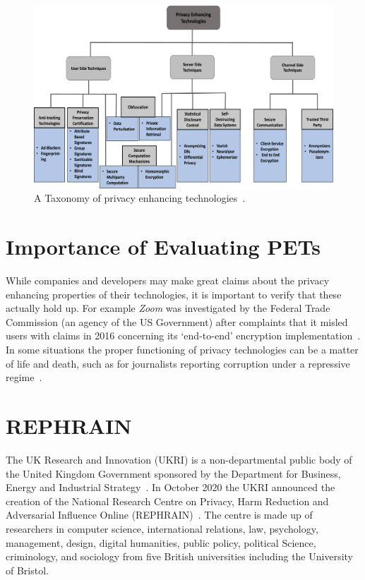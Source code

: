 \documentclass[
    author={Jacob Daniel Halsey},
    supervisor={Prof. Awais Rashid},
    degree={BSc},
    title={Building a Testbed for Evaluating Privacy Enhancing Technologies  (PETs)},
    subtitle={},
    type={software development},
    year={2021}
]{dissertation}
\begin{document}
\begin{figure}
	\centering
	\includegraphics{img/pet_taxonomy}
	\caption{A Taxonomy of privacy enhancing technologies~\cite{kaaniche_2020_privacy}.}
	\label{pet_taxonomy}
\end{figure}

\section{Importance of Evaluating PETs}

While companies and developers may make great claims about the privacy enhancing properties
of their technologies, it is important to verify that these actually hold up.
For example \emph{Zoom} was investigated by the Federal Trade Commission (an agency of the US Government)
after complaints that it misled users with claims in 2016 concerning 
its `end-to-end' encryption implementation~\cite{zoom}.
In some situations the proper functioning of privacy technologies can be a matter of life and
death, such as for journalists reporting corruption under a repressive regime~\cite{transparency}.

\section{REPHRAIN}
\label{sect:rephrain}

The UK Research and Innovation (UKRI) is a non-departmental public body of the United Kingdom Government
sponsored by the Department for Business, Energy and Industrial Strategy~\cite{ukri_who_we_are}.
In October 2020 the UKRI announced the creation of the National Research Centre on Privacy, Harm Reduction
and Adversarial Influence Online (REPHRAIN)~\cite{ukri_new_centre}.
The centre is made up of researchers in computer science, international relations, law, psychology, management,
design, digital humanities, public policy, political Science, criminology, and sociology from five British
universities including the University of Bristol. \\
\end{document}
